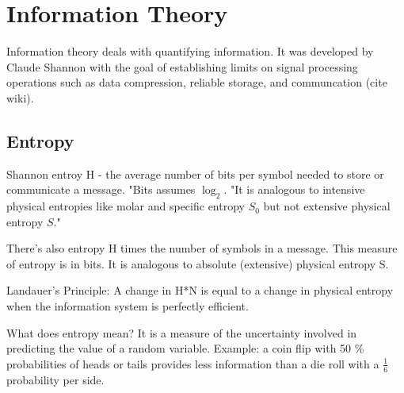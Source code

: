\section{Information Theory}

Information theory deals with quantifying information. It was developed by Claude Shannon with the goal of establishing limits on signal processing operations such as data compression, reliable storage, and communcation (cite wiki). 

\subsection{Entropy}

Shannon entroy H - the average number of bits per symbol needed to store or communicate a message. "Bits assumes $\log_{2}$. "It is analogous to intensive physical entropies like molar and specific entropy $S_{0}$ but not extensive physical entropy $S$."

There's also entropy H times the number of symbols in a message. This measure of entropy is in bits. It is analogous to absolute (extensive) physical entropy S. 

Landauer's Principle: A change in H*N is equal to a change in physical entropy when the information system is perfectly efficient. 

What does entropy mean? It is a measure of the uncertainty involved in predicting the value of a random variable. Example: a coin flip with 50 \% probabilities of heads or tails provides less information than a die roll with a $\frac{1}{6}$ probability per side. 